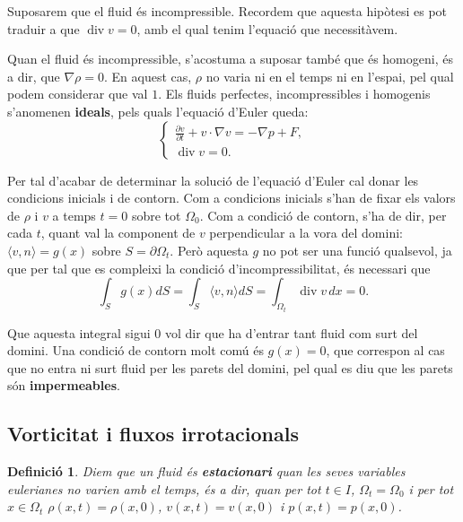 \documentclass{article}
\numberwithin{equation}{section}
\DeclareMathOperator{\diver}{div}
\newtheorem{definicio}{Definici\'{o}}[section]
\begin{document}
Suposarem que el fluid \'{e}s incompressible. Recordem que aquesta hip\`{o}tesi es pot traduir a que $\diver v=0$, amb el qual tenim l'equaci\'{o} que necessit\`{a}vem.

Quan el fluid \'{e}s incompressible, s'acostuma a suposar tamb\'{e} que \'{e}s homogeni, \'{e}s a dir, que $\nabla\rho=0$. En aquest cas, $\rho$ no varia ni en el temps ni en l'espai, pel qual podem considerar que val $1$. Els fluids perfectes, incompressibles i homogenis s'anomenen \textbf{ideals}, pels quals l'equaci\'{o} d'Euler queda:
\begin{equation}\label{Equ. Euler}
\left\{\begin{array}{l}\displaystyle{\frac{\partial v}{\partial t}+v\cdot\nabla v=-\nabla p+F,}\\\diver v=0.\end{array}\right.
\end{equation}

Per tal d'acabar de determinar la soluci\'{o} de l'equaci\'{o} d'Euler cal donar les condicions inicials i de contorn. Com a condicions inicials s'han de fixar els valors de $\rho$ i $v$ a temps $t=0$ sobre tot $\Omega_0$. Com a condici\'{o} de contorn, s'ha de dir, per cada $t$, quant val la component de $v$ perpendicular a la vora del domini: $\langle v,n\rangle=g(x)$ sobre $S=\partial\Omega_t$. Per\`{o} aquesta $g$ no pot ser una funci\'{o} qualsevol, ja que per tal que es compleixi la condici\'{o} d'incompressibilitat, \'{e}s necessari que
\[\int_Sg(x)dS=\int_S\langle v,n\rangle dS=\int_{\Omega_t}\diver v\,dx=0.\]

Que aquesta integral sigui 0 vol dir que ha d'entrar tant fluid com surt del domini. Una condici\'{o} de contorn molt com\'{u} \'{e}s $g(x)=0$, que correspon al cas que no entra ni surt fluid per les parets del domini, pel qual es diu que les parets s\'{o}n \textbf{impermeables}.

\subsection{Vorticitat i fluxos irrotacionals}\label{Sse: vorticitat}

\begin{definicio}
Diem que un fluid \'{e}s \textbf{estacionari} quan les seves variables eulerianes no varien amb el temps, \'{e}s a dir, quan per tot $t\in I$, $\Omega_t=\Omega_0$ i per tot $x\in\Omega_t$ $\rho(x,t)=\rho(x,0)$, $v(x,t)=v(x,0)$ i $p(x,t)=p(x,0)$.
\end{definicio}
\end{document}
